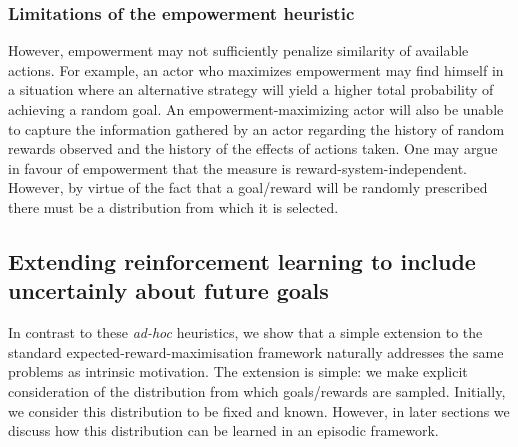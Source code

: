 \documentclass{article}
\begin{document}
\subsubsection{Limitations of the empowerment heuristic}
However, empowerment may not sufficiently penalize similarity of available actions.
For example, an actor who maximizes empowerment may find himself in a situation where an alternative strategy will yield a higher total probability of achieving a random goal.
An empowerment-maximizing actor will also be unable to capture the information gathered by an actor regarding the history of random rewards observed and the history of the effects of actions taken.
One may argue in favour of empowerment that the measure is reward-system-independent.
However, by virtue of the fact that a goal/reward will be randomly prescribed there must be a distribution from which it is selected.  

\subsection{Extending reinforcement learning to include uncertainly about future goals}
In contrast to these \emph{ad-hoc} heuristics, we show that a simple extension to the standard expected-reward-maximisation framework naturally addresses the same problems as intrinsic motivation.
The extension is simple: we make explicit consideration of the distribution from which goals/rewards are sampled.
Initially, we consider this distribution to be fixed and known.
However, in later sections we discuss how this distribution can be learned in an episodic framework.


\end{document}
